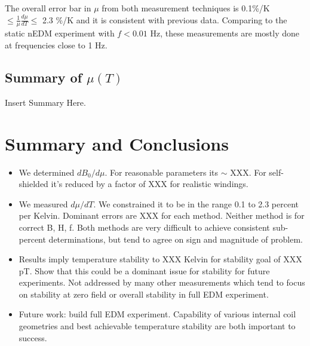 \documentclass[review]{elsarticle}
\begin{document}
\indent The overall error bar in $\mu$ from both measurement techniques is 0.1\%/K $\leq \frac{1}{\mu}\frac{d\mu}{dT} \leq$ 2.3 \%/K and it is consistent with previous data.
Comparing to the static nEDM experiment with $f < 0.01$ Hz, these measurements are mostly done at frequencies close to 1 Hz.




\subsection{Summary of $\mu(T)$}

Insert Summary Here.

\section{Summary and Conclusions}

\begin{itemize}
\item We determined $dB_0/d\mu$.  For reasonable parameters its $\sim$ XXX.  For self-shielded it's reduced by a factor of XXX for realistic windings.
\item We measured $d\mu/dT$.  We constrained it to be in the range 0.1
  to 2.3 percent per Kelvin.  Dominant errors are XXX for each method.
  Neither method is for correct B, H, f.  Both methods are very
  difficult to achieve consistent sub-percent determinations, but tend
  to agree on sign and magnitude of problem.
\item Results imply temperature stability to XXX Kelvin for stability
  goal of XXX pT.  Show that this could be a dominant issue for
  stability for future experiments.  Not addressed by many other
  measurements which tend to focus on stability at zero field or
  overall stability in full EDM experiment.
\item Future work: build full EDM experiment.  Capability of various
  internal coil geometries and best achievable temperature stability
  are both important to success.
\end{itemize}
\end{document}
